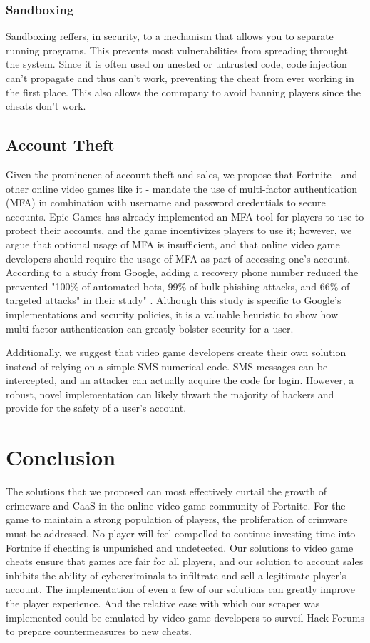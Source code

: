 \documentclass[sigconf]{acmart}
\begin{document}
\subsubsection{Sandboxing}
Sandboxing reffers, in security, to a mechanism that allows you to separate running programs.
This prevents most vulnerabilities from spreading throught the system.
Since it is often used on unested or untrusted code, code injection can't propagate
and thus can't work, preventing the cheat from ever working in the first place. 
This also allows the commpany to avoid banning players since the cheats don't work.


\subsection{Account Theft}
Given the prominence of account theft and sales, we propose that Fortnite -
and other online video games like it - mandate the use of multi-factor
authentication (MFA) in combination with username and password credentials to
secure accounts. Epic Games has already implemented an MFA tool for players to 
use to protect their accounts, and the game incentivizes players to use it;
however, we argue that optional usage of MFA is insufficient, and that online 
video game developers should require the usage of MFA as part of accessing one's
account. According to a study from Google, adding a recovery phone number 
reduced the prevented "100\% of automated bots, 99\% of bulk phishing attacks, 
and 66\% of targeted attacks" in their study" \cite{google}. Although this 
study is specific to Google's implementations and security policies, it is a 
valuable heuristic to show how multi-factor authentication can greatly bolster
security for a user.

Additionally, we suggest that video game developers create their own 
solution instead of relying on a simple SMS numerical code. SMS messages can be 
intercepted, and an attacker can actually acquire the code for login. However,
a robust, novel implementation can likely thwart the majority of hackers and 
provide for the safety of a user's account.

\section{Conclusion}
The solutions that we proposed can most effectively curtail the growth of 
crimeware and CaaS in the online video game community of Fortnite. For the game 
to maintain a strong population of players, the proliferation of crimware must
be addressed. No player will feel compelled to continue investing time into 
Fortnite if cheating is unpunished and undetected. Our solutions to video game
cheats ensure that games are fair for all players, and our solution to account
sales inhibits the ability of cybercriminals to infiltrate and sell a legitimate
player's account. The implementation of even a few of our solutions can greatly
improve the player experience. And the relative ease with which our scraper was 
implemented could be emulated by video game developers to surveil Hack Forums 
to prepare countermeasures to new cheats. 
\end{document}
